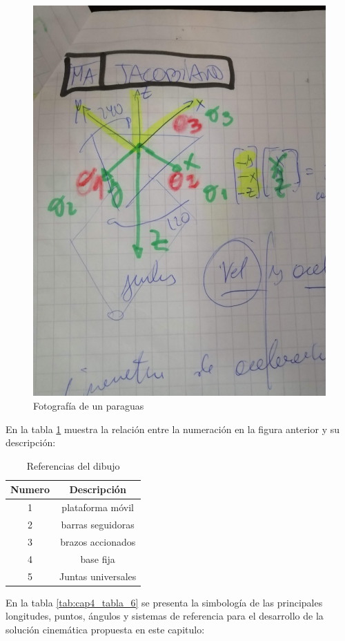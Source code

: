         \begin{figure}[htb]
             \centering
             \includegraphics[width=0.45\linewidth]{Main/Chapter4/Images4/ma_jacobian.jpg}
              \caption{Fotografía de un paraguas}
              \label{f:Cap4_Metodo_A_Modelacion_Cinematica_Posicion_7}
        \end{figure}
        
        
        En la tabla \ref{tab:cap4_tabla_5} muestra la relación entre la numeración en la figura anterior y su descripción:
        
        \begin{table}[h]
            \centering
            \begin{tabular}{c c}
            \hline
                \textbf{Numero}& \textbf{Descripción} \\ 
            \hline             \hline
             1 & plataforma móvil \\
            \hline
             2 & barras seguidoras \\
            \hline
             3 & brazos accionados \\
            \hline
             4 & base fija\\
            \hline
             5 & Juntas universales \\
             \hline
            \end{tabular}
           \caption{Referencias del dibujo}
           \label{tab:cap4_tabla_5}
        \end{table}
      
    \newpage

      En la tabla \ref{tab:cap4_tabla_6} se presenta la simbología de las principales longitudes, puntos, ángulos y sistemas de referencia   para el desarrollo de la solución cinemática propuesta en este capitulo:
 
